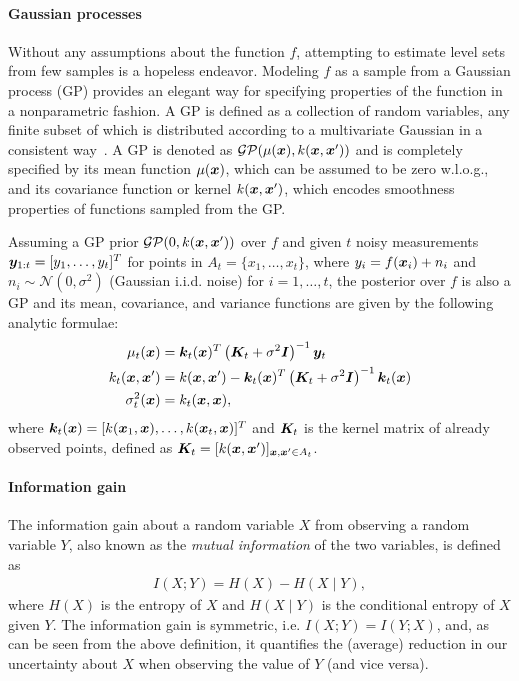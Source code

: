 \paragraph{Gaussian processes}
 Without any assumptions about the function $f$, attempting to estimate level sets from few samples is a hopeless endeavor.
Modeling $f$ as a sample from a Gaussian process
(GP) provides an elegant way for specifying properties of the function in a
nonparametric fashion. A GP is defined as a collection of random variables,
any finite subset of which is distributed according to a
multivariate Gaussian in a consistent way~\cite{rasmussen06}. A GP is
denoted as $\mathcal{GP}(\mu(\bm{x}), k(\bm{x}, \bm{x}'))$ and is
completely specified by its mean function $\mu(\bm{x})$, which can be
assumed to be zero w.l.o.g., and its covariance function or kernel
$k(\bm{x}, \bm{x}')$, which encodes smoothness properties of functions sampled
from the GP.

Assuming a GP prior $\mathcal{GP}(0, k(\bm{x}, \bm{x}'))$ over $f$ and given
$t$ noisy measurements $\bm{y}_{1:t} = [y_1,\ldots,y_t]^T$ for
points in $A_t = \{x_1,\ldots,x_t\}$,
where $y_i = f(\bm{x}_i) + n_i$ and
${n_i \sim \mathcal{N}(0, \sigma^2)}$ (Gaussian i.i.d. noise)
for $i = 1,\ldots,t$, the posterior over $f$ is also a
GP and its mean, covariance, and variance functions are given by the
following analytic formulae:
\begin{align}
\mu_t(\bm{x}) &= \bm{k}_t(\bm{x})^T\left(\bm{K}_t + \sigma^2 \bm{I}\right)^{-1}\bm{y}_t\label{eq:mean}\\
k_t(\bm{x}, \bm{x}') &= k(\bm{x}, \bm{x}') - \bm{k}_t(\bm{x})^T\left(\bm{K}_t + \sigma^2 \bm{I}\right)^{-1}\bm{k}_t(\bm{x})\notag\\
\sigma_t^2(\bm{x}) &= k_t(\bm{x}, \bm{x})\label{eq:var},
\end{align}
where $\bm{k}_t(\bm{x}) = [k(\bm{x}_1, \bm{x}),\ldots,k(\bm{x}_t, \bm{x})]^T$ and $\bm{K}_t$ is
the kernel matrix of already observed points, defined as
${\bm{K}_t = [k(\bm{x}, \bm{x}')]_{\bm{x}, \bm{x}'\in A_t}}$.

\paragraph{Information gain}
The information gain about a random variable $X$ from observing a random
variable $Y$, also known as the \emph{mutual information} of the two variables,
is defined as~\cite{cover06}
\begin{align*}
I(X; Y) = H(X) - H(X\mid Y),
\end{align*}
where $H(X)$ is the entropy of $X$ and $H(X\mid Y)$ is the conditional
entropy of $X$ given $Y$.
The information gain is symmetric, i.e. $I(X; Y) = I(Y; X)$, and,
as can be seen from the above definition, it quantifies the (average) reduction
in our uncertainty about $X$ when observing the value of $Y$ (and vice
versa).

